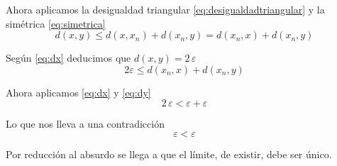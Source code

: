 \documentclass[a4paper,10pt]{article}
\begin{document}
\begin{soluc}
  Ahora aplicamos la desigualdad triangular \eqref{eq:desigualdadtriangular}
  y la simétrica \eqref{eq:simetrica}
  \[
    d(x, y) \leq d(x, x_n) + d(x_n, y) = d(x_n, x) + d(x_n, y)
  \]

  Según \eqref{eq:dx} deducimos que $d(x,y) = 2\,\varepsilon$
  \[
    2\varepsilon \leq d(x_n, x) + d(x_n, y)
  \]

  Ahora aplicamos \eqref{eq:dx} y \eqref{eq:dy}
  \[
    2\,\varepsilon < \varepsilon + \varepsilon
  \]
  
  Lo que nos lleva a una contradicción
  \[
    \varepsilon < \varepsilon
  \]

  Por reducción al absurdo se llega a que el límite, de existir, debe ser
  único.
  
\end{soluc}
\end{document}
